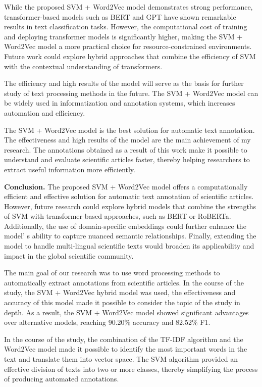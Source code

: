 \begin{multicols}{2}
While the proposed SVM + Word2Vec model demonstrates strong performance,
transformer-based models such as BERT and GPT have shown remarkable
results in text classification tasks. However, the computational cost of
training and deploying transformer models is significantly higher,
making the SVM + Word2Vec model a more practical choice for
resource-constrained environments. Future work could explore hybrid
approaches that combine the efficiency of SVM with the contextual
understanding of transformers.

The efficiency and high results of the model will serve as the basis for
further study of text processing methods in the future. The SVM +
Word2Vec model can be widely used in informatization and annotation
systems, which increases automation and efficiency.

The SVM + Word2Vec model is the best solution for automatic text
annotation. The effectiveness and high results of the model are the main
achievement of my research. The annotations obtained as a result of this
work make it possible to understand and evaluate scientific articles
faster, thereby helping researchers to extract useful information more
efficiently.

{\bfseries Conclusion.} The proposed SVM + Word2Vec model offers a
computationally efficient and effective solution for automatic text
annotation of scientific articles. However, future research could
explore hybrid models that combine the strengths of SVM with
transformer-based approaches, such as BERT or RoBERTa. Additionally, the
use of domain-specific embeddings could further enhance the
model' s ability to capture nuanced semantic
relationships. Finally, extending the model to handle multi-lingual
scientific texts would broaden its applicability and impact in the
global scientific community.

The main goal of our research was to use word processing methods to
automatically extract annotations from scientific articles. In the
course of the study, the SVM + Word2Vec hybrid model was used, the
effectiveness and accuracy of this model made it possible to consider
the topic of the study in depth. As a result, the SVM + Word2Vec model
showed significant advantages over alternative models, reaching 90.20\%
accuracy and 82.52\% F1.

In the course of the study, the combination of the TF-IDF algorithm and
the Word2Vec model made it possible to identify the most important words
in the text and translate them into vector space. The SVM algorithm
provided an effective division of texts into two or more classes,
thereby simplifying the process of producing automated annotations.


\end{multicols}
